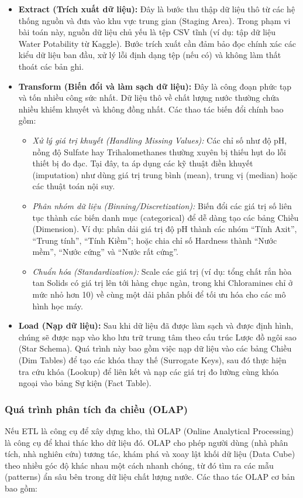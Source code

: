 \begin{itemize}
    \item \textbf{Extract (Trích xuất dữ liệu):} 
    Đây là bước thu thập dữ liệu thô từ các hệ thống nguồn và đưa vào khu vực trung gian (Staging Area). Trong phạm vi bài toán này, nguồn dữ liệu chủ yếu là tệp CSV tĩnh (ví dụ: tập dữ liệu Water Potability từ Kaggle). Bước trích xuất cần đảm bảo đọc chính xác các kiểu dữ liệu ban đầu, xử lý lỗi định dạng tệp (nếu có) và không làm thất thoát các bản ghi.
    
    \item \textbf{Transform (Biến đổi và làm sạch dữ liệu):} 
    Đây là công đoạn phức tạp và tốn nhiều công sức nhất. Dữ liệu thô về chất lượng nước thường chứa nhiều khiếm khuyết và không đồng nhất. Các thao tác biến đổi chính bao gồm:
    \begin{itemize}
        \item \textit{Xử lý giá trị khuyết (Handling Missing Values):} Các chỉ số như độ pH, nồng độ Sulfate hay Trihalomethanes thường xuyên bị thiếu hụt do lỗi thiết bị đo đạc. Tại đây, ta áp dụng các kỹ thuật điền khuyết (imputation) như dùng giá trị trung bình (mean), trung vị (median) hoặc các thuật toán nội suy.
        \item \textit{Phân nhóm dữ liệu (Binning/Discretization):} Biến đổi các giá trị số liên tục thành các biến danh mục (categorical) để dễ dàng tạo các bảng Chiều (Dimension). Ví dụ: phân dải giá trị độ pH thành các nhóm ``Tính Axit'', ``Trung tính'', ``Tính Kiềm''; hoặc chia chỉ số Hardness thành ``Nước mềm'', ``Nước cứng'' và ``Nước rất cứng''.
        \item \textit{Chuẩn hóa (Standardization):} Scale các giá trị (ví dụ: tổng chất rắn hòa tan Solids có giá trị lên tới hàng chục ngàn, trong khi Chloramines chỉ ở mức nhỏ hơn 10) về cùng một dải phân phối để tối ưu hóa cho các mô hình học máy.
    \end{itemize}
    
    \item \textbf{Load (Nạp dữ liệu):} 
    Sau khi dữ liệu đã được làm sạch và được định hình, chúng sẽ được nạp vào kho lưu trữ trung tâm theo cấu trúc Lược đồ ngôi sao (Star Schema). Quá trình này bao gồm việc nạp dữ liệu vào các bảng Chiều (Dim Tables) để tạo các khóa thay thế (Surrogate Keys), sau đó thực hiện tra cứu khóa (Lookup) để liên kết và nạp các giá trị đo lường cùng khóa ngoại vào bảng Sự kiện (Fact Table).
\end{itemize}

\subsubsection{Quá trình phân tích đa chiều (OLAP)}
Nếu ETL là công cụ để xây dựng kho, thì OLAP (Online Analytical Processing) là công cụ để khai thác kho dữ liệu đó. OLAP cho phép người dùng (nhà phân tích, nhà nghiên cứu) tương tác, khám phá và xoay lật khối dữ liệu (Data Cube) theo nhiều góc độ khác nhau một cách nhanh chóng, từ đó tìm ra các mẫu (patterns) ẩn sâu bên trong dữ liệu chất lượng nước. Các thao tác OLAP cơ bản bao gồm:

